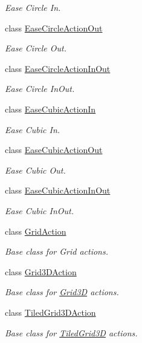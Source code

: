 \begin{DoxyCompactItemize}
\begin{DoxyCompactList}\small\item\em Ease Circle In. \end{DoxyCompactList}\item 
class \hyperlink{classEaseCircleActionOut}{Ease\+Circle\+Action\+Out}
\begin{DoxyCompactList}\small\item\em Ease Circle Out. \end{DoxyCompactList}\item 
class \hyperlink{classEaseCircleActionInOut}{Ease\+Circle\+Action\+In\+Out}
\begin{DoxyCompactList}\small\item\em Ease Circle In\+Out. \end{DoxyCompactList}\item 
class \hyperlink{classEaseCubicActionIn}{Ease\+Cubic\+Action\+In}
\begin{DoxyCompactList}\small\item\em Ease Cubic In. \end{DoxyCompactList}\item 
class \hyperlink{classEaseCubicActionOut}{Ease\+Cubic\+Action\+Out}
\begin{DoxyCompactList}\small\item\em Ease Cubic Out. \end{DoxyCompactList}\item 
class \hyperlink{classEaseCubicActionInOut}{Ease\+Cubic\+Action\+In\+Out}
\begin{DoxyCompactList}\small\item\em Ease Cubic In\+Out. \end{DoxyCompactList}\item 
class \hyperlink{classGridAction}{Grid\+Action}
\begin{DoxyCompactList}\small\item\em Base class for Grid actions. \end{DoxyCompactList}\item 
class \hyperlink{classGrid3DAction}{Grid3\+D\+Action}
\begin{DoxyCompactList}\small\item\em Base class for \hyperlink{classGrid3D}{Grid3D} actions. \end{DoxyCompactList}\item 
class \hyperlink{classTiledGrid3DAction}{Tiled\+Grid3\+D\+Action}
\begin{DoxyCompactList}\small\item\em Base class for \hyperlink{classTiledGrid3D}{Tiled\+Grid3D} actions. \end{DoxyCompactList}\item 

\end{DoxyCompactItemize}
